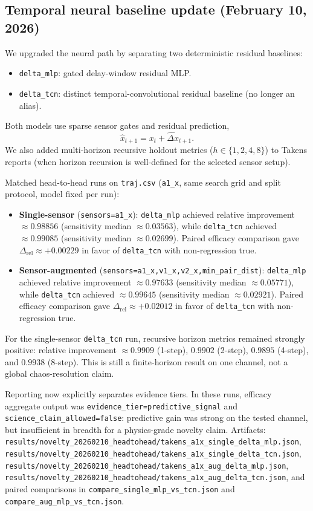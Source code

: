 \documentclass[11pt]{article}
\begin{document}
\subsection{Temporal neural baseline update (February 10, 2026)}
We upgraded the neural path by separating two deterministic residual baselines:
\begin{itemize}
\item \texttt{delta\_mlp}: gated delay-window residual MLP.
\item \texttt{delta\_tcn}: distinct temporal-convolutional residual baseline (no longer an alias).
\end{itemize}
Both models use sparse sensor gates and residual prediction,
\[
\hat{x}_{t+1}=x_t+\widehat{\Delta x}_{t+1}.
\]
We also added multi-horizon recursive holdout metrics ($h\in\{1,2,4,8\}$) to Takens reports (when horizon recursion is well-defined for the selected sensor setup).

Matched head-to-head runs on \texttt{traj.csv} (\texttt{a1\_x}, same search grid and split protocol, model fixed per run):
\begin{itemize}
\item \textbf{Single-sensor} (\texttt{sensors=a1\_x}): \texttt{delta\_mlp} achieved relative improvement $\approx 0.98856$ (sensitivity median $\approx 0.03563$), while \texttt{delta\_tcn} achieved $\approx 0.99085$ (sensitivity median $\approx 0.02699$). Paired efficacy comparison gave $\Delta_{\mathrm{rel}}\approx +0.00229$ in favor of \texttt{delta\_tcn} with non-regression true.
\item \textbf{Sensor-augmented} (\texttt{sensors=a1\_x,v1\_x,v2\_x,min\_pair\_dist}): \texttt{delta\_mlp} achieved relative improvement $\approx 0.97633$ (sensitivity median $\approx 0.05771$), while \texttt{delta\_tcn} achieved $\approx 0.99645$ (sensitivity median $\approx 0.02921$). Paired efficacy comparison gave $\Delta_{\mathrm{rel}}\approx +0.02012$ in favor of \texttt{delta\_tcn} with non-regression true.
\end{itemize}
For the single-sensor \texttt{delta\_tcn} run, recursive horizon metrics remained strongly positive: relative improvement $\approx 0.9909$ (1-step), $0.9902$ (2-step), $0.9895$ (4-step), and $0.9938$ (8-step). This is still a finite-horizon result on one channel, not a global chaos-resolution claim.

Reporting now explicitly separates evidence tiers. In these runs, efficacy aggregate output was \texttt{evidence\_tier=predictive\_signal} and \texttt{science\_claim\_allowed=false}: predictive gain was strong on the tested channel, but insufficient in breadth for a physics-grade novelty claim.
Artifacts: \texttt{results/novelty\_20260210\_headtohead/takens\_a1x\_single\_delta\_mlp.json}, \texttt{results/novelty\_20260210\_headtohead/takens\_a1x\_single\_delta\_tcn.json}, \texttt{results/novelty\_20260210\_headtohead/takens\_a1x\_aug\_delta\_mlp.json}, \texttt{results/novelty\_20260210\_headtohead/takens\_a1x\_aug\_delta\_tcn.json}, and paired comparisons in \texttt{compare\_single\_mlp\_vs\_tcn.json} and \texttt{compare\_aug\_mlp\_vs\_tcn.json}.
\end{document}
